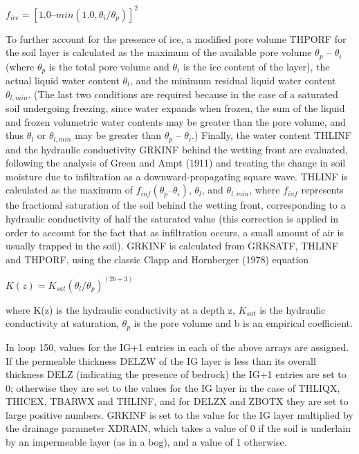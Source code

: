 $f_{ice} = [1.0 – min(1.0, \theta_i / \theta_p )]^2$

To further account for the presence of ice, a modified pore volume T\+H\+P\+O\+R\+F for the soil layer is calculated as the maximum of the available pore volume $\theta_p$ – $\theta_i$ (where $\theta_p$ is the total pore volume and $\theta_i$ is the ice content of the layer), the actual liquid water content $\theta_l$, and the minimum residual liquid water content $\theta_{l,min}$. (The last two conditions are required because in the case of a saturated soil undergoing freezing, since water expands when frozen, the sum of the liquid and frozen volumetric water contents may be greater than the pore volume, and thus $\theta_l$ or $\theta_{l,min}$ may be greater than $\theta_p$ – $\theta_i$.) Finally, the water content T\+H\+L\+I\+N\+F and the hydraulic conductivity G\+R\+K\+I\+N\+F behind the wetting front are evaluated, following the analysis of Green and Ampt (1911) and treating the change in soil moisture due to infiltration as a downward-\/propagating square wave. T\+H\+L\+I\+N\+F is calculated as the maximum of $f_{inf} ( \theta_p – \theta_i)$, $\theta_l$, and $\theta_{l,min}$, where $f_{inf}$ represents the fractional saturation of the soil behind the wetting front, corresponding to a hydraulic conductivity of half the saturated value (this correction is applied in order to account for the fact that as infiltration occurs, a small amount of air is usually trapped in the soil). G\+R\+K\+I\+N\+F is calculated from G\+R\+K\+S\+A\+T\+F, T\+H\+L\+I\+N\+F and T\+H\+P\+O\+R\+F, using the classic Clapp and Hornberger (1978) equation

$K(z) = K_{sat} ( \theta_l / \theta_p)^{(2b + 3)}$

where K(z) is the hydraulic conductivity at a depth z, $K_{sat}$ is the hydraulic conductivity at saturation, $\theta_p$ is the pore volume and b is an empirical coefficient.

In loop 150, values for the I\+G+1 entries in each of the above arrays are assigned. If the permeable thickness D\+E\+L\+Z\+W of the I\+G layer is less than its overall thickness D\+E\+L\+Z (indicating the presence of bedrock) the I\+G+1 entries are set to 0; otherwise they are set to the values for the I\+G layer in the case of T\+H\+L\+I\+Q\+X, T\+H\+I\+C\+E\+X, T\+B\+A\+R\+W\+X and T\+H\+L\+I\+N\+F, and for D\+E\+L\+Z\+X and Z\+B\+O\+T\+X they are set to large positive numbers. G\+R\+K\+I\+N\+F is set to the value for the I\+G layer multiplied by the drainage parameter X\+D\+R\+A\+I\+N, which takes a value of 0 if the soil is underlain by an impermeable layer (as in a bog), and a value of 1 otherwise.

